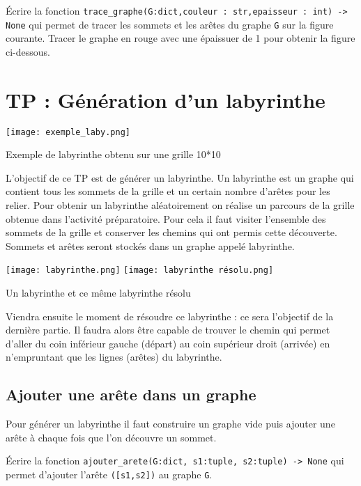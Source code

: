 \begin{question}
Écrire la fonction \lstinline{trace_graphe(G:dict,couleur : str,epaisseur : int) -> None} qui permet de tracer les sommets et les arêtes du graphe \lstinline{G} sur la figure courante. Tracer le graphe en rouge avec une épaissuer de 1 pour obtenir la figure ci-dessous.
\end{question}

\newpage
\section*{TP : Génération d'un labyrinthe}

\begin{marginfigure}
\texttt{[image: exemple\_laby.png]}
\caption{Exemple de labyrinthe obtenu sur une grille 10*10}
\end{marginfigure}


L'objectif de ce TP est de générer un labyrinthe. Un labyrinthe est un graphe qui contient tous les sommets de la grille et un certain nombre d'arêtes pour les relier.
Pour obtenir un labyrinthe aléatoirement on réalise un parcours de la grille obtenue dans l'activité préparatoire.
Pour cela il faut visiter l'ensemble des sommets de la grille et conserver les chemins qui ont permis cette découverte. Sommets et arêtes seront stockés dans un graphe appelé labyrinthe.


\begin{marginfigure}\centering
	\texttt{[image: labyrinthe.png]}
            \texttt{[image: labyrinthe résolu.png]}            
\caption{Un labyrinthe et ce même labyrinthe résolu}
\end{marginfigure}


Viendra ensuite le moment de résoudre ce labyrinthe : ce sera l'objectif de la dernière partie. Il faudra alors être capable de trouver le chemin qui permet d'aller du coin inférieur gauche (départ) au coin supérieur droit (arrivée) en n'empruntant que les lignes (arêtes) du labyrinthe. 

\subsection*{Ajouter une arête dans un graphe}
Pour générer un labyrinthe il faut construire un graphe vide puis ajouter une arête à chaque fois que l'on découvre un sommet.



\begin{question}
Écrire la fonction \lstinline{ajouter_arete(G:dict, s1:tuple, s2:tuple) -> None} qui permet d'ajouter l'arête \lstinline{([s1,s2])} au graphe \lstinline{G}. 
\end{question}

